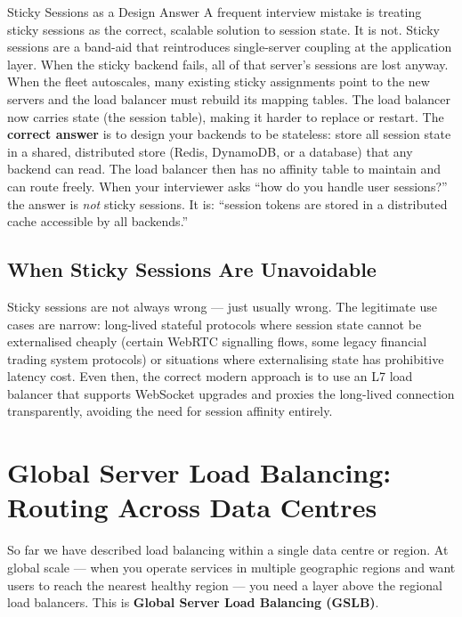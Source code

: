 \documentclass[11pt,a4paper]{article}
\begin{document}
\begin{trapbox}{Sticky Sessions as a Design Answer}
  A frequent interview mistake is treating sticky sessions as the correct, scalable solution to
  session state. It is not. Sticky sessions are a band-aid that reintroduces single-server
  coupling at the application layer. When the sticky backend fails, all of that server's sessions
  are lost anyway. When the fleet autoscales, many existing sticky assignments point to the new
  servers and the load balancer must rebuild its mapping tables. The load balancer now carries state
  (the session table), making it harder to replace or restart. The \textbf{correct answer} is to
  design your backends to be stateless: store all session state in a shared, distributed store
  (Redis, DynamoDB, or a database) that any backend can read. The load balancer then has no
  affinity table to maintain and can route freely. When your interviewer asks ``how do you handle
  user sessions?'' the answer is \emph{not} sticky sessions. It is: ``session tokens are stored
  in a distributed cache accessible by all backends.''
\end{trapbox}

\subsection{When Sticky Sessions Are Unavoidable}

Sticky sessions are not always wrong --- just usually wrong. The legitimate use cases are narrow:
long-lived stateful protocols where session state cannot be externalised cheaply (certain WebRTC
signalling flows, some legacy financial trading system protocols) or situations where externalising
state has prohibitive latency cost. Even then, the correct modern approach is to use an L7 load
balancer that supports WebSocket upgrades and proxies the long-lived connection transparently,
avoiding the need for session affinity entirely.

\section{Global Server Load Balancing: Routing Across Data Centres}

So far we have described load balancing within a single data centre or region. At global scale ---
when you operate services in multiple geographic regions and want users to reach the nearest healthy
region --- you need a layer above the regional load balancers. This is \textbf{Global Server Load
Balancing (GSLB)}.
\end{document}

